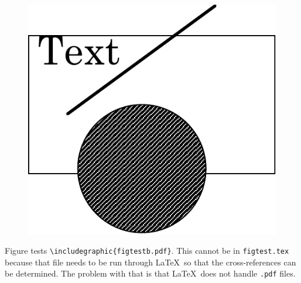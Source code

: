 \documentclass{article}
\begin{document}
\begin{figure}
\includegraphics{figtestb.pdf}
\end{figure}

Figure tests \verb#\includegraphic{figtestb.pdf}#.  This cannot be in
\texttt{figtest.tex} because that file needs to be run through \LaTeX\
so that the cross-references can be determined.  The problem with
that is that \LaTeX\ does not handle \texttt{.pdf} files.  
\end{document}
